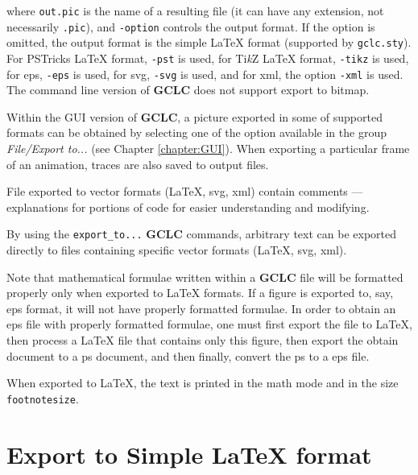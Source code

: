 \documentclass[a4paper]{book}
\newcommand{\gclc}{{\bfseries GCLC}\xspace}
\begin{document}
\noindent
where \verb|out.pic| is the name of a resulting file (it can have any
extension, not necessarily \verb|.pic|), and \verb|-option| controls
the output format. If the option is omitted, the output format is
the simple \LaTeX{} format (supported by \verb|gclc.sty|).
For PSTricks \LaTeX{} format, \verb|-pst| is used,
for Ti{\em k}Z \LaTeX{} format, \verb|-tikz| is used,
for {\sc eps}, \verb|-eps| is used, for {\sc svg}, \verb|-svg| is
used, and for {\sc xml}, the option \verb|-xml| is used.
The command line version of \gclc does not support export to bitmap.

Within the GUI version of \gclc, a picture exported in some of 
supported formats can be obtained by selecting one of the option 
available in the group {\it File/Export to...} (see Chapter 
\ref{chapter:GUI}). When exporting a particular frame of an
animation, traces are also saved to output files.

File exported to vector formats (\LaTeX, {\sc svg}, {\sc xml})
contain comments --- explanations for portions of code for
easier understanding and modifying.

By using the \verb|export_to...| \gclc commands, arbitrary text can
be exported directly to files containing specific vector formats
(\LaTeX, {\sc svg}, {\sc xml}).

Note that mathematical formulae written within a \gclc file
will be formatted properly only when exported to \LaTeX{} formats.
If a figure is exported to, say, {\sc eps} format, it will
not have properly formatted formulae. In order to obtain an {\sc eps}
file with properly formatted formulae, one must first export the
file to \LaTeX{}, then process a \LaTeX{} file that contains
only this figure, then export the obtain document to a {\sc ps}
document, and then finally, convert the {\sc ps} to a {\sc eps} file.

When exported to \LaTeX{}, the text is printed in the math mode and
in the size \verb|footnotesize|.


\section{Export to Simple \LaTeX{} format}
\end{document}
